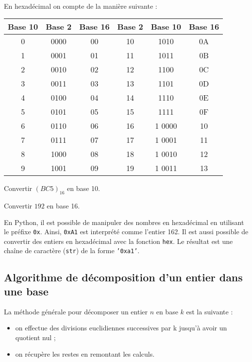 \begin{exemple} ~\\
\begin{minipage}[c]{.6\linewidth}
En hexadécimal on compte de la manière suivante : 
\begin{center}
\begin{tabular}{|c|c|c||c|c|c|}
\hline
Base 10 & Base 2 & Base 16 & Base 2 & Base 10 & Base 16 \\
\hline \hline
0 & 0000 & 00 & 10 & 1010 & 0A \\ \hline
1 & 0001& 01 & 11  & 1011 & 0B \\ \hline
2 & 0010& 02 & 12  & 1100 & 0C \\ \hline
3 & 0011& 03 & 13  & 1101 & 0D \\ \hline
4 & 0100& 04 & 14  & 1110 & 0E \\ \hline
5 & 0101& 05 & 15  & 1111 & 0F \\ \hline
6 & 0110& 06 & 16  & 1 0000 & 10\\ \hline
7 & 0111& 07 & 17  & 1 0001 & 11 \\ \hline
8 & 1000& 08 & 18  & 1 0010 & 12 \\ \hline
9 & 1001& 09 & 19  & 1 0011 & 13 \\ \hline
\end{tabular}
\end{center}
\end{minipage}%
\begin{minipage}[t]{.37\linewidth}
Convertir $\left(BC5 \right)_{16}$ en base 10.

Convertir $192$ en base 16.
\end{minipage}
\end{exemple}


En Python, il est possible de manipuler des nombres en hexadécimal en utilisant le préfixe \texttt{0x}. Ainsi, \texttt{0xA1} est interprété comme l'entier 162. 
Il est aussi possible de convertir des entiers en hexadécimal avec la fonction \texttt{hex}. Le résultat est une chaîne de caractère (\texttt{str}) de la forme \texttt{'0xa1'}.


\subsection{Algorithme de décomposition d'un entier dans une base}
\begin{methode}
La méthode générale pour décomposer un entier $n$ en base $k$ est la suivante :
\begin{itemize}
\item on effectue des divisions euclidiennes successives par k jusqu’à avoir un quotient nul ;
\item on récupère les restes en remontant les calculs.
\end{itemize}
\end{methode}


